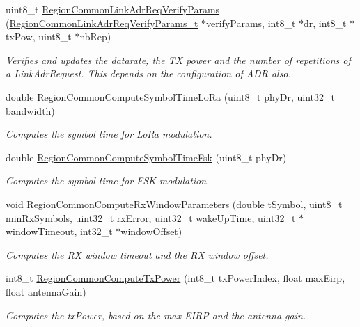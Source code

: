 \begin{DoxyCompactItemize}
uint8\+\_\+t \mbox{\hyperlink{group___r_e_g_i_o_n_c_o_m_m_o_n_ga2c87f98f09793dc7fa63a9801feeed73}{Region\+Common\+Link\+Adr\+Req\+Verify\+Params}} (\mbox{\hyperlink{group___r_e_g_i_o_n_c_o_m_m_o_n_gad186afbaf1b52893ddc3fa5eba88de0a}{Region\+Common\+Link\+Adr\+Req\+Verify\+Params\+\_\+t}} $\ast$verify\+Params, int8\+\_\+t $\ast$dr, int8\+\_\+t $\ast$tx\+Pow, uint8\+\_\+t $\ast$nb\+Rep)
\begin{DoxyCompactList}\small\item\em Verifies and updates the datarate, the TX power and the number of repetitions of a Link\+Adr\+Request. This depends on the configuration of A\+DR also. \end{DoxyCompactList}\item 
double \mbox{\hyperlink{group___r_e_g_i_o_n_c_o_m_m_o_n_ga79ed8b6555b68276d3c9ff2626b20fc8}{Region\+Common\+Compute\+Symbol\+Time\+Lo\+Ra}} (uint8\+\_\+t phy\+Dr, uint32\+\_\+t bandwidth)
\begin{DoxyCompactList}\small\item\em Computes the symbol time for Lo\+Ra modulation. \end{DoxyCompactList}\item 
double \mbox{\hyperlink{group___r_e_g_i_o_n_c_o_m_m_o_n_gacc2af896b03aa8ed8d8e5950d96d365f}{Region\+Common\+Compute\+Symbol\+Time\+Fsk}} (uint8\+\_\+t phy\+Dr)
\begin{DoxyCompactList}\small\item\em Computes the symbol time for F\+SK modulation. \end{DoxyCompactList}\item 
void \mbox{\hyperlink{group___r_e_g_i_o_n_c_o_m_m_o_n_gaba7114d0ca01f04933710feb13646138}{Region\+Common\+Compute\+Rx\+Window\+Parameters}} (double t\+Symbol, uint8\+\_\+t min\+Rx\+Symbols, uint32\+\_\+t rx\+Error, uint32\+\_\+t wake\+Up\+Time, uint32\+\_\+t $\ast$window\+Timeout, int32\+\_\+t $\ast$window\+Offset)
\begin{DoxyCompactList}\small\item\em Computes the RX window timeout and the RX window offset. \end{DoxyCompactList}\item 
int8\+\_\+t \mbox{\hyperlink{group___r_e_g_i_o_n_c_o_m_m_o_n_gaa92800c8e9ce21366d383d14878cc391}{Region\+Common\+Compute\+Tx\+Power}} (int8\+\_\+t tx\+Power\+Index, float max\+Eirp, float antenna\+Gain)
\begin{DoxyCompactList}\small\item\em Computes the tx\+Power, based on the max E\+I\+RP and the antenna gain. \end{DoxyCompactList}\item 

\end{DoxyCompactItemize}
